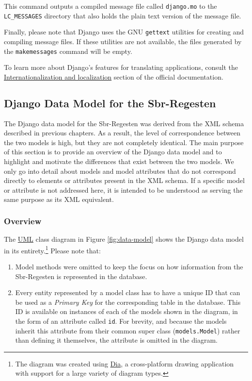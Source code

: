 This command outputs a compiled message file called \texttt{django.mo}
to the \texttt{LC\_MESSAGES} directory that also holds the plain text
version of the message file.

Finally, please note that Django uses the GNU \texttt{gettext}
utilities for creating and compiling message files. If these utilities
are not available, the files generated by the \texttt{makemessages}
command will be empty.

To learn more about Django's features for translating applications,
consult the
\href{https://docs.djangoproject.com/en/1.4/topics/i18n/}{Internationalization
  and localization} section of the official documentation.

\subsection{Django Data Model for the Sbr-Regesten}
\label{sec:data-model}

The Django data model for the Sbr-Regesten was derived from the XML
schema described in previous chapters. As a result, the level of
correspondence between the two models is high, but they are not
completely identical. The main purpose of this section is to provide
an overview of the Django data model and to highlight and motivate the
differences that exist between the two models. We only go into detail
about models and model attributes that do not correspond directly to
elements or attributes present in the XML schema. If a specific model
or attribute is not addressed here, it is intended to be understood as
serving the same purpose as its XML equivalent.

\subsubsection{Overview}
\label{sec:model-overview}

The
\href{https://en.wikipedia.org/wiki/Unified_Modeling_Language}{UML}
class diagram in Figure \ref{fig:data-model} shows the Django data
model in its entirety.\footnote{The diagram was created using
  \href{http://projects.gnome.org/dia/}{Dia}, a cross-platform drawing
  application with support for a large variety of diagram types.}
Please note that:

\begin{enumerate}
\item Model methods were omitted to keep the focus on how information
  from the Sbr-Regesten is represented in the database.
\item Every entity represented by a model class has to have a unique
  ID that can be used as a \emph{Primary Key} for the corresponding
  table in the database. This ID is available on instances of each of
  the models shown in the diagram, in the form of an attribute called
  \texttt{id}. For brevity, and because the models inherit this
  attribute from their common super class (\texttt{models.Model})
  rather than defining it themselves, the attribute is omitted in the
  diagram.
\end{enumerate}


